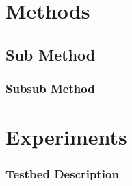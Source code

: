 \documentclass[a4paper, 10pt, conference]{ieeeconf}        %
\begin{document}
\section{Methods}
\lipsum[3]\cite{1990ICRA-Simon-SelfTuningRobotPrimitivesSnapFit}

\subsection{Sub Method}
\lipsum[2-3]
\subsubsection{Subsub Method}

\lipsum[3]
\section{Experiments}\label{sec:Experiments}

\subsubsection{Testbed Description}
\lipsum[2-3]
\end{document}
